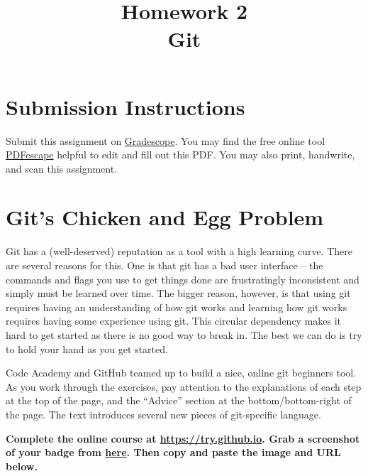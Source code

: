 \documentclass{article}
\begin{document}
\fancyhead[L]{}
\fancyhead[R]{}

\fancyfoot[C]{\color{gray} \thepage~/~\pageref*{LastPage}}
\pagestyle{fancyplain}

\title{\textbf{Homework 2\\Git}}
\author{\textbf{\color{red}{Due: Wednesday, September 27th, 11:59PM (Hard Deadline)}}}
\date{}
\maketitle


\section*{Submission Instructions}
Submit this assignment on \href{https://gradescope.com/courses/9999}{Gradescope}.
You may find the free online tool \href{https://www.pdfescape.com}{PDFescape}
helpful to edit and fill out this PDF.
You may also print, handwrite, and scan this assignment.


\section{Git's Chicken and Egg Problem}

Git has a (well-deserved) reputation as a tool with a high learning curve.
There are several reasons for this. One is that git has a bad user interface
-- the commands and flags you use to get things done are frustratingly
inconsistent and simply must be learned over time.
The bigger reason, however, is that using git requires having an understanding
of how git works and learning how git works requires having some experience
using git. This circular dependency makes it hard to get started as there is
no good way to break in. The best we can do is try to hold your hand as you
get started.

\medskip
\noindent
Code Academy and GitHub teamed up to build a nice, online git beginners tool.
As you work through the exercises, pay attention to the explanations of each
step at the top of the page, and the ``Advice'' section at the
bottom/bottom-right of the page. The text introduces several new pieces of
git-specific language.

\medskip
\noindent
\textbf{Complete the online course at \url{https://try.github.io}. Grab a
  screenshot of your badge from \href{https://www.codeschool.com/account/prizes}{here}.
  Then copy and paste the image and URL below.
  \color{red}{\small (You will need to sign in or create an account to get your badge)}
}
\end{document}
